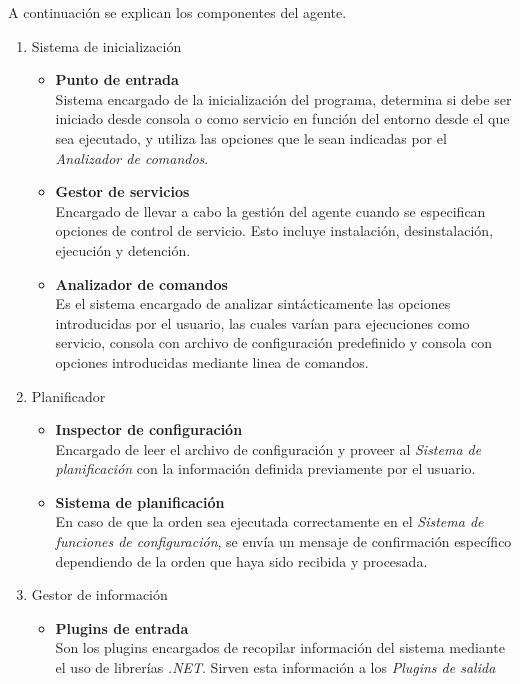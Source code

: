             A continuación se explican los componentes del agente.

            \begin{enumerate}
                \item Sistema de inicialización
                    \begin{itemize}
                        \item \textbf{Punto de entrada} \\
                        Sistema encargado de la inicialización del programa, determina si debe ser iniciado desde consola o como servicio en función del entorno desde el que sea ejecutado, y utiliza las opciones que le sean indicadas por el \textit{Analizador de comandos}.
                            
                        \item \textbf{Gestor de servicios} \\ 
                        Encargado de llevar a cabo la gestión del agente cuando se especifican opciones de control de servicio. Esto incluye instalación, desinstalación, ejecución y detención.
                            
                        \item \textbf{Analizador de comandos} \\ 
                        Es el sistema encargado de analizar sintácticamente las opciones introducidas por el usuario, las cuales varían para ejecuciones como servicio, consola con archivo de configuración predefinido y consola con opciones introducidas mediante linea de comandos.
                    \end{itemize}
                \item Planificador
                    \begin{itemize}
                        \item \textbf{Inspector de configuración} \\ 
                        Encargado de leer el archivo de configuración y proveer al \textit{Sistema de planificación} con la información definida previamente por el usuario.
                        
                        \item \textbf{Sistema de planificación} \\
                        En caso de que la orden sea ejecutada correctamente en el \textit{Sistema de funciones de configuración}, se envía un mensaje de confirmación específico dependiendo de la orden que haya sido recibida y procesada.
                    \end{itemize}
                \item Gestor de información
                    \begin{itemize}
                        \item \textbf{Plugins de entrada} \\ 
                        Son los plugins encargados de recopilar información del sistema mediante el uso de librerías \textit{.NET}. Sirven esta información a los \textit{Plugins de salida}
                            

\end{itemize}
\end{enumerate}
